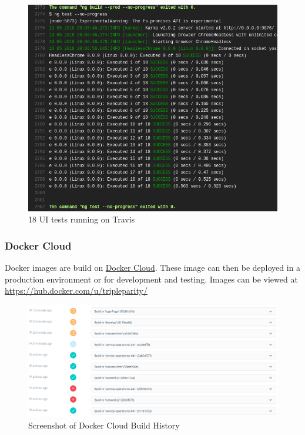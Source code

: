 \documentclass[]{article}
\begin{document}
\begin{figure}[H]
	\centering
	\includegraphics[scale=0.5]{travis_ui_tests_output_1.png}
	\caption{18 UI tests running on Travis}
\end{figure}

\subsubsection{Docker Cloud}
Docker images are build on \href{https://cloud.docker.com/}{Docker Cloud}.
These image can then be deployed in a production environment or for development and testing.
Images can be viewed at \url{https://hub.docker.com/u/tripleparity/}

\begin{figure}[H]
	\centering
	\includegraphics[scale=0.5]{docker_cloud_build_history.png}
	\caption{Screenshot of Docker Cloud Build History}
\end{figure}
\end{document}
